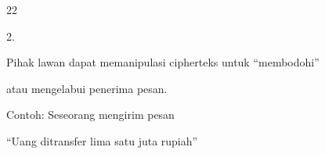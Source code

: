 \documentclass{article}
\begin{document}

22

2.

Pihak lawan dapat memanipulasi cipherteks untuk “membodohi” 

atau mengelabui penerima pesan.


Contoh: Seseorang mengirim pesan


     “Uang ditransfer lima satu juta rupiah”
\end{document}
